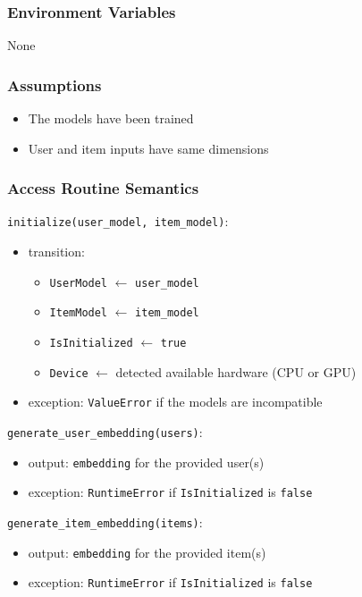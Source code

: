 \documentclass[12pt, titlepage]{article}
\begin{document}
\subsubsection{Environment Variables}

None

\subsubsection{Assumptions}

\begin{itemize}
  \item The models have been trained
  \item User and item inputs have same dimensions
\end{itemize}
\subsubsection{Access Routine Semantics}

\noindent \texttt{initialize(user\_model, item\_model)}:
\begin{itemize}
\item transition:
  \begin{itemize}
    \item \texttt{UserModel} $\leftarrow$ \texttt{user\_model}
    \item \texttt{ItemModel} $\leftarrow$ \texttt{item\_model}
    \item \texttt{IsInitialized} $\leftarrow$ \texttt{true}
    \item \texttt{Device} $\leftarrow$ detected available hardware (CPU or GPU)
  \end{itemize}
\item exception: \texttt{ValueError} if the models are incompatible
\end{itemize}

\noindent \texttt{generate\_user\_embedding(users)}:
\begin{itemize}
\item output: \texttt{embedding} for the provided user(s)
\item exception: \texttt{RuntimeError} if \texttt{IsInitialized} is \texttt{false}
\end{itemize}

\noindent \texttt{generate\_item\_embedding(items)}:
\begin{itemize}
\item output: \texttt{embedding} for the provided item(s)
\item exception: \texttt{RuntimeError} if \texttt{IsInitialized} is \texttt{false}
\end{itemize}
\end{document}
